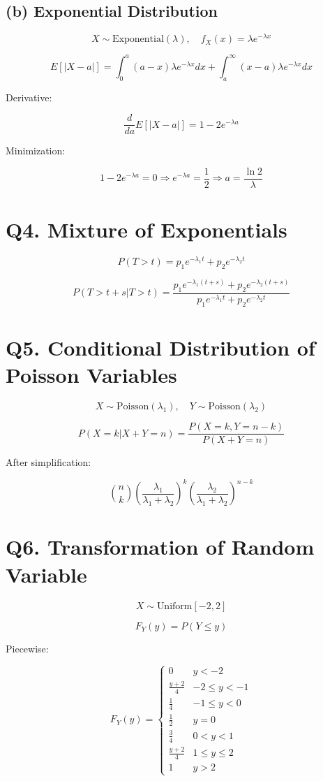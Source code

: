 \documentclass[11pt]{article}
\begin{document}
\subsection*{(b) Exponential Distribution}

\[
X \sim \text{Exponential}(\lambda), \quad f_X(x) = \lambda e^{-\lambda x}
\]

\[
E[|X - a|] =
\int_0^a (a - x)\lambda e^{-\lambda x} dx +
\int_a^\infty (x - a)\lambda e^{-\lambda x} dx
\]

Derivative:

\[
\frac{d}{da} E[|X - a|] = 1 - 2e^{-\lambda a}
\]

Minimization:

\[
1 - 2e^{-\lambda a} = 0
\Rightarrow e^{-\lambda a} = \frac{1}{2}
\Rightarrow a = \frac{\ln 2}{\lambda}
\]

\section*{Q4. Mixture of Exponentials}

\[
P(T > t) = p_1 e^{-\lambda_1 t} + p_2 e^{-\lambda_2 t}
\]

\[
P(T > t+s | T > t) =
\frac{p_1 e^{-\lambda_1(t+s)} + p_2 e^{-\lambda_2(t+s)}}
{p_1 e^{-\lambda_1 t} + p_2 e^{-\lambda_2 t}}
\]

\section*{Q5. Conditional Distribution of Poisson Variables}

\[
X \sim \text{Poisson}(\lambda_1), \quad Y \sim \text{Poisson}(\lambda_2)
\]

\[
P(X = k | X + Y = n) =
\frac{P(X=k, Y=n-k)}{P(X+Y=n)}
\]

After simplification:

\[
\binom{n}{k}
\left(\frac{\lambda_1}{\lambda_1 + \lambda_2}\right)^k
\left(\frac{\lambda_2}{\lambda_1 + \lambda_2}\right)^{n-k}
\]

\section*{Q6. Transformation of Random Variable}

\[
X \sim \text{Uniform}[-2,2]
\]

\[
F_Y(y) = P(Y \le y)
\]

Piecewise:

\[
F_Y(y) =
\begin{cases}
0 & y < -2 \\
\frac{y+2}{4} & -2 \le y < -1 \\
\frac{1}{4} & -1 \le y < 0 \\
\frac{1}{2} & y = 0 \\
\frac{3}{4} & 0 < y < 1 \\
\frac{y+2}{4} & 1 \le y \le 2 \\
1 & y > 2
\end{cases}
\]
\end{document}
